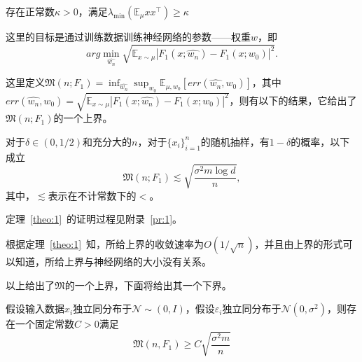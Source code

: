 \begin{assumption}
存在正常数$\kappa > 0$，满足$\lambda_{\min}(\mathbb{E}_\mu x x^\top )\geq \kappa$
\end{assumption}
\par
这里的目标是通过训练数据训练神经网络的参数——权重$w$，即
\[
	arg\min_{\hat{w_n}} \sqrt{\mathbb{E}_{x\sim\mu}|F_1(x;\hat{w_n})- F_1(x;w_0)|^2}.
\]
\par
这里定义$\mathfrak{M}(n;F_1) = \inf_{\hat{w_n}}\sup_{w_0}\mathbb{E}_{\mu,w_0}[err(\hat{w_n},w_0)]$，其中$err(\hat{w_n},w_0) = \sqrt{\mathbb{E}_{x\sim\mu}|F_1(x;\hat{w_n})- F_1(x;w_0)|^2}$，则有以下的结果，它给出了$\mathfrak{M}(n;F_1)$的一个上界。
\begin{theorem}\label{theo:1}
对于$\delta\in (0,1/2)$和充分大的$n$，对于$\{x_i\}_{i=1}^n$的随机抽样，有$1-\delta$的概率，以下成立
\[
	\mathfrak{M}(n;F_1) \lesssim \sqrt{\frac{\sigma^2 m \log d}{n}},
\]
其中，$\lesssim$表示在不计常数下的$<$。
\end{theorem}
\par
定理~\ref{theo:1}~的证明过程见附录~\ref{pr:1}。

\par
根据定理~\ref{theo:1}~知，所给上界的收敛速率为$O(1/\sqrt{n})$，并且由上界的形式可以知道，所给上界与神经网络的大小没有关系。
\par
以上给出了$\mathfrak{M}$的一个上界，下面将给出其一个下界。
\begin{theorem}\label{theo:2}
假设输入数据$x_i$独立同分布于$\mathcal{N}\sim (0,I)$，假设$\varepsilon_i$独立同分布于$\mathcal{N}(0,\sigma^2)$，则存在一个固定常数$C > 0$满足
\begin{equation}
\mathfrak{M}(n,F_1) \geq C\sqrt{\frac{\sigma^2 m}{n}}
\end{equation}
\end{theorem}



